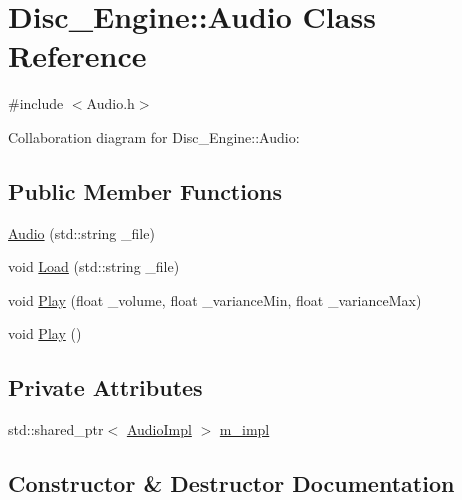 \hypertarget{class_disc___engine_1_1_audio}{}\section{Disc\+\_\+\+Engine\+:\+:Audio Class Reference}
\label{class_disc___engine_1_1_audio}


{\ttfamily \#include $<$Audio.\+h$>$}



Collaboration diagram for Disc\+\_\+\+Engine\+:\+:Audio\+:
\subsection*{Public Member Functions}
\begin{DoxyCompactItemize}
\item 
\mbox{\hyperlink{class_disc___engine_1_1_audio_a7cdcc0906dc012d6db0413a474b77688}{Audio}} (std\+::string \+\_\+file)
\item 
void \mbox{\hyperlink{class_disc___engine_1_1_audio_af0738b4f4815eadcb3ed36a29e1601d3}{Load}} (std\+::string \+\_\+file)
\item 
void \mbox{\hyperlink{class_disc___engine_1_1_audio_ac5d1489aec521a97badd977d5eb93247}{Play}} (float \+\_\+volume, float \+\_\+variance\+Min, float \+\_\+variance\+Max)
\item 
void \mbox{\hyperlink{class_disc___engine_1_1_audio_a8c35b6601e9953672cb3430a6a2e48d5}{Play}} ()
\end{DoxyCompactItemize}
\subsection*{Private Attributes}
\begin{DoxyCompactItemize}
\item 
std\+::shared\+\_\+ptr$<$ \mbox{\hyperlink{struct_disc___engine_1_1_audio_impl}{Audio\+Impl}} $>$ \mbox{\hyperlink{class_disc___engine_1_1_audio_a48cd67333f402e0e3f73e3cf70482f07}{m\+\_\+impl}}
\end{DoxyCompactItemize}


\subsection{Constructor \& Destructor Documentation}
\mbox{\label{class_disc___engine_1_1_audio_a7cdcc0906dc012d6db0413a474b77688}} 
